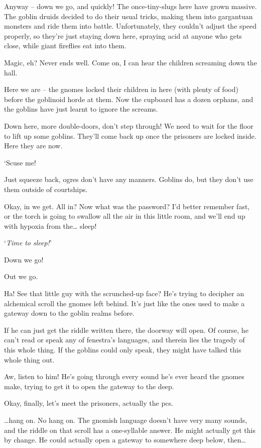\begin{multicols}{2}
\begin{exampletext}
Anyway -- down we go, and quickly!
The once-tiny-slugs here have grown massive.
The goblin druids decided to do their usual tricks, making them into gargantuan monsters and ride them into battle.
Unfortunately, they couldn't adjust the speed properly, so they're just staying down here, spraying acid at anyone who gets close, while giant fireflies eat into them.

Magic, eh?
Never ends well.
Come on, I can hear the children screaming down the hall.

Here we are -- the gnomes locked their children in here (with plenty of food) before the goblinoid horde at them.
Now the cupboard has a dozen orphans, and the goblins have just learnt to ignore the screams.

Down here, more double-doors, don't step through!
We need to wait for the floor to lift up some goblins.
They'll come back up once the prisoners are locked inside.
Here they are now.

`Scuse me!

Just squeeze back, ogres don't have any manners.
Goblins do, but they don't use them outside of courtships.

Okay, in we get.
All in?
Now what was the password?
I'd better remember fast, or the torch is going to swallow all the air in this little room, and we'll end up with hypoxia from the\ldots
sleep!

`\textit{Time to sleep!}'

Down we go!

Out we go.

Ha!
See that little guy with the scrunched-up face?
He's trying to decipher an alchemical scroll the gnomes left behind.
It's just like the ones used to make a gateway down to the goblin realms before.

If he can just get the riddle written there, the doorway will open.
Of course, he can't read or speak any of \gls{fenestra}'s languages, and therein lies the tragedy of this whole thing.
If the goblins could only speak, they might have talked this whole thing out.

Aw, listen to him!
He's going through every sound he's ever heard the gnomes make, trying to get it to open the gateway to the \gls{deep}.

Okay, finally, let's meet the prisoners, actually the \glspl{pc}.

\ldots hang on.
No hang on.
The gnomish language doesn't have very many sounds, and the riddle on that scroll has a one-syllable answer.
He might actually get this by change.
He could actually open a gateway to somewhere deep below, then\ldots


\end{exampletext}
\end{multicols}
